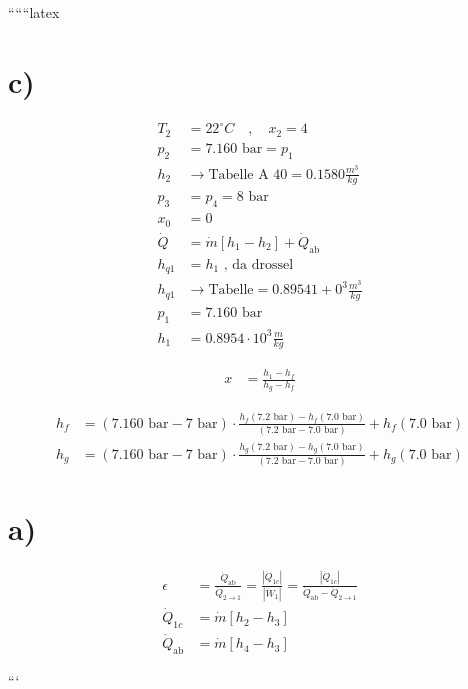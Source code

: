 ``````latex

\section*{c)}

\begin{align*}
T_2 &= 22^\circ C \quad , \quad x_2 = 4 \\
p_2 &= 7.160 \text{ bar} = p_1 \\
h_2 &\rightarrow \text{Tabelle A 40} = 0.1580 \frac{m^3}{kg} \\
p_3 &= p_4 = 8 \text{ bar} \\
x_0 &= 0 \\
\dot{Q} &= \dot{m} \left[ h_1 - h_2 \right] + \dot{Q}_{\text{ab}} \\
h_{q1} &= h_1 \text{ , da drossel} \\
h_{q1} &\rightarrow \text{Tabelle} = 0.89541 + 0^3 \frac{m^3}{kg} \\
p_1 &= 7.160 \text{ bar} \\
h_1 &= 0.8954 \cdot 10^3 \frac{m}{kg}
\end{align*}

\begin{align*}
x &= \frac{h_1 - h_f}{h_g - h_f}
\end{align*}

\begin{align*}
h_f &= (7.160 \text{ bar} - 7 \text{ bar}) \cdot \frac{h_f(7.2 \text{ bar}) - h_f(7.0 \text{ bar})}{(7.2 \text{ bar} - 7.0 \text{ bar})} + h_f(7.0 \text{ bar}) \\
h_g &= (7.160 \text{ bar} - 7 \text{ bar}) \cdot \frac{h_g(7.2 \text{ bar}) - h_g(7.0 \text{ bar})}{(7.2 \text{ bar} - 7.0 \text{ bar})} + h_g(7.0 \text{ bar})
\end{align*}

\section*{a)}

\begin{align*}
\epsilon &= \frac{\dot{Q}_{\text{ab}}}{\dot{Q}_{2 \rightarrow 1}} = \frac{\left| \dot{Q}_{1c} \right|}{\left| \dot{W}_1 \right|} = \frac{\left| \dot{Q}_{1c} \right|}{\dot{Q}_{\text{ab}} - \dot{Q}_{2 \rightarrow 1}} \\
\dot{Q}_{1c} &= \dot{m} \left[ h_2 - h_3 \right] \\
\dot{Q}_{\text{ab}} &= \dot{m} \left[ h_4 - h_3 \right]
\end{align*}

```